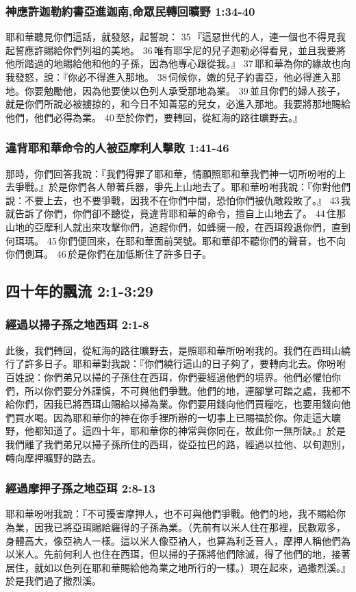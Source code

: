 \subsubsection{神應許迦勒約書亞進迦南,命眾民轉回曠野 1:34-40}
耶和華聽見你們這話，就發怒，起誓說： 35 『這惡世代的人，連一個也不得見我起誓應許賜給你們列祖的美地。 36 唯有耶孚尼的兒子迦勒必得看見，並且我要將他所踏過的地賜給他和他的子孫，因為他專心跟從我。』 37 耶和華為你的緣故也向我發怒，說：『你必不得進入那地。 38 伺候你，嫩的兒子約書亞，他必得進入那地。你要勉勵他，因為他要使以色列人承受那地為業。 39 並且你們的婦人孩子，就是你們所說必被擄掠的，和今日不知善惡的兒女，必進入那地。我要將那地賜給他們，他們必得為業。 40 至於你們，要轉回，從紅海的路往曠野去。』

\subsubsection{違背耶和華命令的人被亞摩利人擊敗 1:41-46}
那時，你們回答我說：『我們得罪了耶和華，情願照耶和華我們神一切所吩咐的上去爭戰。』於是你們各人帶著兵器，爭先上山地去了。耶和華吩咐我說：『你對他們說：不要上去，也不要爭戰，因我不在你們中間，恐怕你們被仇敵殺敗了。』 43 我就告訴了你們，你們卻不聽從，竟違背耶和華的命令，擅自上山地去了。 44 住那山地的亞摩利人就出來攻擊你們，追趕你們，如蜂擁一般，在西珥殺退你們，直到何珥瑪。 45 你們便回來，在耶和華面前哭號。耶和華卻不聽你們的聲音，也不向你們側耳。 46 於是你們在加低斯住了許多日子。

\subsection{四十年的飄流 2:1-3:29}
\subsubsection{經過以掃子孫之地西珥 2:1-8}
此後，我們轉回，從紅海的路往曠野去，是照耶和華所吩咐我的。我們在西珥山繞行了許多日子。耶和華對我說：『你們繞行這山的日子夠了，要轉向北去。你吩咐百姓說：你們弟兄以掃的子孫住在西珥，你們要經過他們的境界。他們必懼怕你們，所以你們要分外謹慎，不可與他們爭戰。他們的地，連腳掌可踏之處，我都不給你們，因我已將西珥山賜給以掃為業。你們要用錢向他們買糧吃，也要用錢向他們買水喝。因為耶和華你的神在你手裡所辦的一切事上已賜福於你。你走這大曠野，他都知道了。這四十年，耶和華你的神常與你同在，故此你一無所缺。』於是我們離了我們弟兄以掃子孫所住的西珥，從亞拉巴的路，經過以拉他、以旬迦別，轉向摩押曠野的路去。


\subsubsection{經過摩押子孫之地亞珥 2:8-13}
耶和華吩咐我說：『不可擾害摩押人，也不可與他們爭戰。他們的地，我不賜給你為業，因我已將亞珥賜給羅得的子孫為業。（先前有以米人住在那裡，民數眾多，身體高大，像亞衲人一樣。這以米人像亞衲人，也算為利乏音人，摩押人稱他們為以米人。先前何利人也住在西珥，但以掃的子孫將他們除滅，得了他們的地，接著居住，就如以色列在耶和華賜給他為業之地所行的一樣。）現在起來，過撒烈溪。』於是我們過了撒烈溪。


